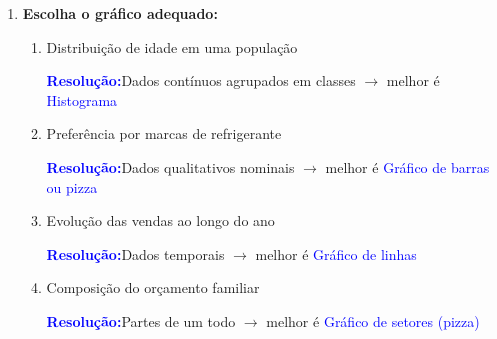 \documentclass[11pt]{article}
\newcommand{\respostaNum}[1]{\textcolor{blue}{\boxed{#1}}}   %
\newcommand{\respostaTxt}[1]{\textcolor{blue}{#1}}           %
\newcommand{\resolucao}{\textbf{\textcolor{blue}{Resolução:}}}
\begin{document}
\begin{multicols}{2}
\begin{enumerate}[leftmargin=*]
\begin{enumerate}[label=\alph*)]
\item Calcule o ponto médio de cada classe

\resolucao
\[x_1 = \frac{1000+1500}{2} = \respostaNum{1250}, \quad \]
\[x_2 = \frac{1500+2000}{2} = \respostaNum{1750}, \quad \]
\[x_3 = \frac{2000+2500}{2} = \respostaNum{2250}\]
\[x_4 = \frac{2500+3000}{2} = \respostaNum{2750}, \quad \]
\[x_5 = \frac{3000+3500}{2} = \respostaNum{3250} \]

\item Calcule a média aproximada

\resolucao
\[
\bar{x} = \frac{1250 \cdot 8 + 1750 \cdot 12 + 2250 \cdot 15 + 2750 \cdot 10 + 3250 \cdot 5}{8+12+15+10+5}
\]
\[
    \bar{x} = \frac{10000 + 21000 + 33750 + 27500 + 16250}{50} \]
\[ = \frac{108500}{50} = \respostaNum{R\$ 2170,00}\]

\item Em qual classe está a mediana?

\resolucao Total = 50, mediana está na posição 25,5. Acumulando:
Classe 1: 8, Classe 2: 20, Classe 3: 35 (atinge 35, ultrapassando 25,5)

\respostaTxt{Classe 2000-2500}
\end{enumerate}

\item \textbf{Escolha o gráfico adequado:}

\begin{enumerate}[label=\alph*)]
\item Distribuição de idade em uma população

\resolucao Dados contínuos agrupados em classes $\rightarrow$ melhor é \respostaTxt{Histograma}

\item Preferência por marcas de refrigerante

\resolucao Dados qualitativos nominais $\rightarrow$ melhor é \respostaTxt{Gráfico de barras ou pizza}

\item Evolução das vendas ao longo do ano

\resolucao Dados temporais $\rightarrow$ melhor é \respostaTxt{Gráfico de linhas}

\item Composição do orçamento familiar

\resolucao Partes de um todo $\rightarrow$ melhor é \respostaTxt{Gráfico de setores (pizza)}
\end{enumerate}


\end{enumerate}
\end{multicols}
\end{document}
